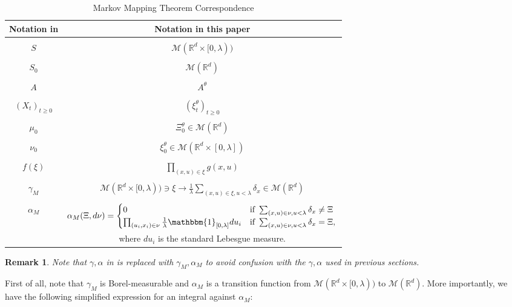 \documentclass[12pt]{article}
\newtheorem{remark}[theorem]{Remark}
\begin{document}
\begin{table}[h]
    \centering
    \begin{tabular}{c|c}
    Notation in \cite{kurtz/rodrigues:2011} & Notation in this paper \\
    \hline\\
      $S$   &  $\mathcal{M}(\mathbb{R}^d \times [0, \lambda))$\\\\
       $S_0$  &  $\mathcal{M}(\mathbb{R}^d)$\\\\
       $A$ & $A^{\theta}$\\\\
       $(X_t)_{t \geq 0}$ & $(\xi^{\theta}_t)_{t \geq 0}$\\\\
       $\mu_0$ & $\Xi^{\theta}_0 \in \mathcal{M}(\mathbb{R}^d)$\\\\
       $\nu_0$ & $\xi^{\theta}_0 \in \mathcal{M}(\mathbb{R}^d \times [0,\lambda])$\\\\
       $f(\xi)$ & $\prod_{(x,u) \in \xi} g(x,u)$\\\\
        $\gamma_M$ & $ \mathcal{M}(\mathbb{R}^d \times [0, \lambda)) \ni \xi \to \frac{1}{\lambda}\sum_{(x,u) \in \xi, u < \lambda} \delta_{x} \in \mathcal{M}(\mathbb{R}^d)$\\\\
       $\alpha_M$ & $ \alpha_M(\Xi,d \nu) =     \begin{cases}
      0 & \text{if } \sum_{(x,u) \in \nu, u < \lambda} \delta_x \neq \Xi\\
       \prod_{(u_i,x_i) \in \nu} \frac{1}{\lambda} \mathbbm{1}_{[0,\lambda]}du_i & \text{if } \sum_{(x,u) \in \nu, u < \lambda} \delta_x = \Xi,\\
    \end{cases} $\\
&      where $du_i$ is the standard Lebesgue measure.
    \end{tabular}
    \caption{Markov Mapping Theorem Correspondence}
    \label{Markov Mapping Theorem Notation Table}
\end{table}
\begin{remark}
Note that $\gamma,\alpha$ in \cite{kurtz/rodrigues:2011} is replaced with $\gamma_M,\alpha_M$ to avoid confusion with the $\gamma, \alpha$ used in previous sections.
\end{remark}
First of all, note that $\gamma_M$ is Borel-measurable and $\alpha_M$ is a transition function from $\mathcal{M}(\mathbb{R}^d \times [0, \lambda))$ to $\mathcal{M}(\mathbb{R}^d)$. More importantly, we have the following simplified expression for an integral against $\alpha_M$:
\end{document}
